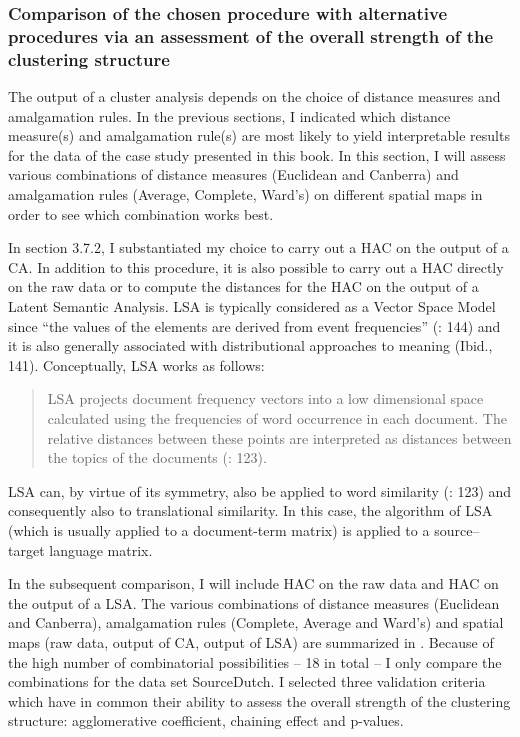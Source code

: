 \subsubsection{\label{sec:3.7.2.4}  Comparison of the chosen procedure with alternative procedures via an assessment of the overall strength of the clustering structure}

The output of a cluster analysis depends on the choice of distance measures and amalgamation rules. In the previous sections, I indicated which distance measure(s) and amalgamation rule(s) are most likely to yield interpretable results for the data of the case study presented in this book. In this section, I will assess various combinations of distance measures (Euclidean and Canberra) and amalgamation rules (Average, Complete, Ward’s) on different spatial maps in order to see which combination works best.



In section 3.7.2, I substantiated my choice to carry out a HAC on the output of a CA. In addition to this procedure, it is also possible to carry out a HAC directly on the raw data or to compute the distances for the HAC on the output of a Latent Semantic Analysis. LSA is typically considered as a Vector Space Model since “the values of the elements are derived from event frequencies” (\citealt{turney_frequency_2010}: 144) and it is also generally associated with distributional approaches to meaning (Ibid., 141). Conceptually, LSA works as follows:


\begin{quote}
LSA projects document frequency vectors into a low dimensional space calculated using the frequencies of word occurrence in each document. The relative distances between these points are interpreted as distances between the topics of the documents (\citealt{mehler_models_2007}: 123).
\end{quote}


LSA can, by virtue of its symmetry, also be applied to word similarity (\citealt{mehler_models_2007}: 123) and consequently also to translational similarity. In this case, the algorithm of LSA (which is usually applied to a document-term matrix) is applied to a source–target language matrix.



In the subsequent comparison, I will include HAC on the raw data and HAC on the output of a LSA. The various combinations of distance measures (Euclidean and Canberra), amalgamation rules (Complete, Average and Ward’s) and spatial maps (raw data, output of CA, output of LSA) are summarized in . Because of the high number of combinatorial possibilities – 18 in total – I only compare the combinations for the data set SourceDutch. I selected three validation criteria which have in common their ability to assess the overall strength of the clustering structure: agglomerative coefficient, chaining effect and p-values.



